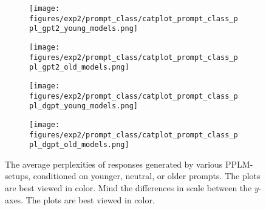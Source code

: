 \begin{figure}[H]
     \centering
     \begin{subfigure}[b]{0.48\textwidth}
        \centering
        \texttt{[image: figures/exp2/prompt\_class/catplot\_prompt\_class\_ppl\_gpt2\_young\_models.png]}
        \caption{}
        \label{subfig:catplot_prompt_class_ppl_gpt2_young}
     \end{subfigure}
     \quad
     \begin{subfigure}[b]{0.48\textwidth}
        \centering
        \texttt{[image: figures/exp2/prompt\_class/catplot\_prompt\_class\_ppl\_gpt2\_old\_models.png]}
        \caption{}
        \label{subfig:catplot_prompt_class_ppl_gpt2_old}
     \end{subfigure}
    \medskip
    \begin{subfigure}[b]{0.48\textwidth}
        \centering
        \texttt{[image: figures/exp2/prompt\_class/catplot\_prompt\_class\_ppl\_dgpt\_young\_models.png]}
        \caption{}
        \label{subfig:catplot_prompt_class_ppl_dgpt_young}
     \end{subfigure}
    \quad
     \begin{subfigure}[b]{0.48\textwidth}
        \centering
        \texttt{[image: figures/exp2/prompt\_class/catplot\_prompt\_class\_ppl\_dgpt\_old\_models.png]}
        \caption{}
        \label{subfig:catplot_prompt_class_ppl_dgpt_old}
     \end{subfigure}
    \caption{The average perplexities of responses generated by various PPLM-setups, conditioned on younger, neutral, or older prompts. The plots are best viewed in color. Mind the differences in scale between the $y$-axes. The plots are best viewed in color.}
    \label{fig:catplot_prompt_class_ppl}
\end{figure}




